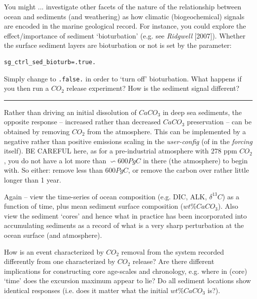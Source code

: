 \noindent You might ... investigate other facets of the nature of the relationship between ocean and sediments (and weathering) as how climatic (biogeochemical) signals are encoded in the marine geological record. For instance, you could explore the effect/importance of sediment ‘bioturbation’ (e.g. see \textit{Ridgwell} [2007]). Whether the surface sediment layers are bioturbation or not is set by the parameter:
\vspace{-1mm}\begin{verbatim}
sg_ctrl_sed_bioturb=.true.
\end{verbatim}\vspace{-1mm}
Simply change to \texttt{.false.} in order to ‘turn off’ bioturbation. What happens if you then run a \(CO_{2}\) release experiment? How is the sediment signal different?

\vspace{1mm}\noindent\rule{4cm}{0.1mm}\vspace{2mm}

\noindent Rather than driving an initial dissolution of \(CaCO_{3}\) in deep sea sediments, the opposite response -- increased rather than decreased \(CaCO_{3}\) preservation -- can be obtained by removing \(CO_{2}\) from the atmosphere. This can be implemented by a negative rather than positive emissions scaling in the \textit{user-config} (of in the \textit{forcing} itself). BE CAREFUL here, as for a pre-industrial atmosphere with 278 ppm \(CO_{2}\), you do not have a lot more than \(\backsim600 PgC\) in there (the atmosphere) to begin with. So either: remove less than \(600 PgC\), or remove the carbon over rather little longer than 1 year.

Again – view the time-series of ocean composition (e.g. DIC, ALK, \(\delta^{13} C\)) as a function of time, plus mean sediment surface composition (\(wt\% CaCO_{3}\)). Also view the sediment ‘cores’ and hence what in practice has been incorporated into accumulating sediments as a record of what is a very sharp perturbation at the ocean surface (and atmosphere).

How  is an event characterized by \(CO_{2}\) removal from the system recorded differently from one characterized by \(CO_{2}\) release? Are there different implications for constructing core age-scales and chronology, e.g. where in (core) ‘time’ does the excursion maximum appear to lie? Do all sediment locations show identical responses (i.e. does it matter what the initial \(wt\% CaCO_{3}\) is?).

